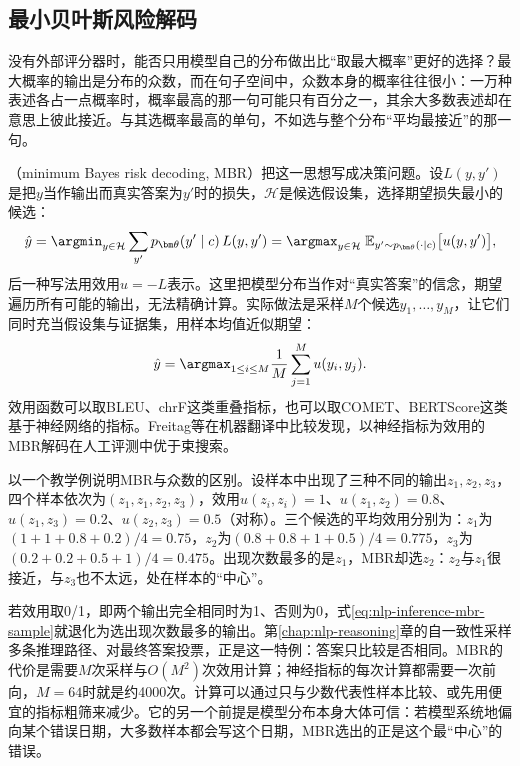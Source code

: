 \subsection{最小贝叶斯风险解码}
\label{sec:nlp-inference-mbr}

没有外部评分器时，能否只用模型自己的分布做出比“取最大概率”更好的选择？最大概率的输出是分布的众数，而在句子空间中，众数本身的概率往往很小：一万种表述各占一点概率时，概率最高的那一句可能只有百分之一，其余大多数表述却在意思上彼此接近。与其选概率最高的单句，不如选与整个分布“平均最接近”的那一句。

（minimum Bayes risk decoding, MBR）把这一思想写成决策问题。设$L(y,y')$是把$y$当作输出而真实答案为$y'$时的损失，$\mathcal H$是候选假设集，选择期望损失最小的候选：
\begin{equation}
 \hat y=\argmin_{y\in\mathcal H}\sum_{y'}p_{\bm\theta}(y'\mid c)\,L(y,y')
 =\argmax_{y\in\mathcal H}\;\mathbb E_{y'\sim p_{\bm\theta}(\cdot\mid c)}\bigl[u(y,y')\bigr],
 \label{eq:nlp-inference-mbr}
\end{equation}
后一种写法用效用$u=-L$表示。这里把模型分布当作对“真实答案”的信念，期望遍历所有可能的输出，无法精确计算。实际做法是采样$M$个候选$y_1,\ldots,y_M$，让它们同时充当假设集与证据集，用样本均值近似期望：
\begin{equation}
 \hat y=\argmax_{1\leq i\leq M}\frac1M\sum_{j=1}^{M}u(y_i,y_j).
 \label{eq:nlp-inference-mbr-sample}
\end{equation}
效用函数可以取BLEU、chrF这类重叠指标，也可以取COMET、BERTScore这类基于神经网络的指标。Freitag等在机器翻译中比较发现，以神经指标为效用的MBR解码在人工评测中优于束搜索。

以一个教学例说明MBR与众数的区别。设样本中出现了三种不同的输出$z_1,z_2,z_3$，四个样本依次为$(z_1,z_1,z_2,z_3)$，效用$u(z_i,z_i)=1$、$u(z_1,z_2)=0.8$、$u(z_1,z_3)=0.2$、$u(z_2,z_3)=0.5$（对称）。三个候选的平均效用分别为：$z_1$为$(1+1+0.8+0.2)/4=0.75$，$z_2$为$(0.8+0.8+1+0.5)/4=0.775$，$z_3$为$(0.2+0.2+0.5+1)/4=0.475$。出现次数最多的是$z_1$，MBR却选$z_2$：$z_2$与$z_1$很接近，与$z_3$也不太远，处在样本的“中心”。

若效用取0/1，即两个输出完全相同时为1、否则为0，式\eqref{eq:nlp-inference-mbr-sample}就退化为选出现次数最多的输出。第\ref{chap:nlp-reasoning}章的自一致性采样多条推理路径、对最终答案投票，正是这一特例：答案只比较是否相同。MBR的代价是需要$M$次采样与$O(M^2)$次效用计算；神经指标的每次计算都需要一次前向，$M=64$时就是约4000次。计算可以通过只与少数代表性样本比较、或先用便宜的指标粗筛来减少。它的另一个前提是模型分布本身大体可信：若模型系统地偏向某个错误日期，大多数样本都会写这个日期，MBR选出的正是这个最“中心”的错误。

